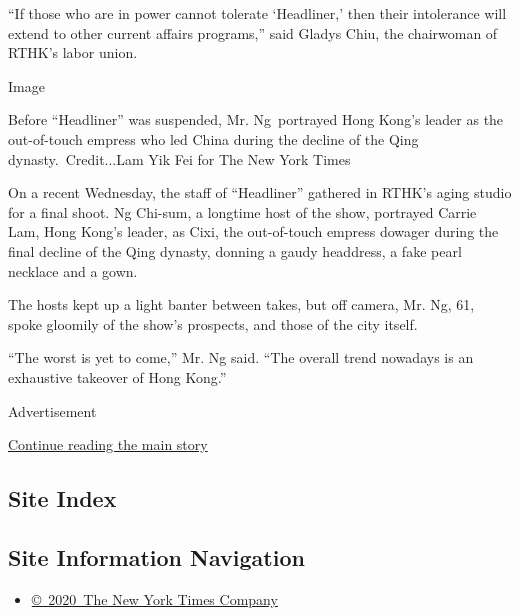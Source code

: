 ``If those who are in power cannot tolerate `Headliner,' then their
intolerance will extend to other current affairs programs,'' said Gladys
Chiu, the chairwoman of RTHK's labor union.

Image

Before ``Headliner'' was suspended, Mr. Ng~portrayed Hong Kong's leader
as the out-of-touch empress who led China during the decline of the Qing
dynasty.~Credit...Lam Yik Fei for The New York Times

On a recent Wednesday, the staff of ``Headliner'' gathered in RTHK's
aging studio for a final shoot. Ng Chi-sum, a longtime host of the show,
portrayed Carrie Lam, Hong Kong's leader, as Cixi, the out-of-touch
empress dowager during the final decline of the Qing dynasty, donning a
gaudy headdress, a fake pearl necklace and a gown.

The hosts kept up a light banter between takes, but off camera, Mr. Ng,
61, spoke gloomily of the show's prospects, and those of the city
itself.

``The worst is yet to come,'' Mr. Ng said. ``The overall trend nowadays
is an exhaustive takeover of Hong Kong.''

Advertisement

\protect\hyperlink{after-bottom}{Continue reading the main story}

\hypertarget{site-index}{%
\subsection{Site Index}\label{site-index}}

\hypertarget{site-information-navigation}{%
\subsection{Site Information
Navigation}\label{site-information-navigation}}

\begin{itemize}
\tightlist
\item
  \href{https://help.nytimes3xbfgragh.onion/hc/en-us/articles/115014792127-Copyright-notice}{©~2020~The
  New York Times Company}
\end{itemize}

